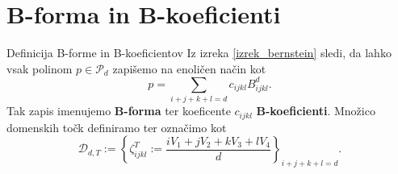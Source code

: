 \documentclass{beamer}
\begin{document}
\section{B-forma in B-koeficienti}
\begin{frame}{Definicija B-forme in B-koeficientov}
Iz izreka \ref{izrek_bernstein} sledi, da lahko vsak polinom $p \in \mathcal{P}_d$ zapišemo na enoličen način kot
\begin{equation}\label{eq_Bforma}
    p = \sum_{i+j+k+l = d} c_{ijkl} B_{ijkl}^d.
\end{equation}
Tak zapis imenujemo \textbf{B-forma} ter koeficente $c_{ijkl}$ \textbf{B-koeficienti}.
Množico domenskih točk definiramo ter označimo kot
\begin{equation}
    \mathcal{D}_{d,T} := 
    \left\{
        \zeta_{ijkl}^T:= \frac{i V_1 + j V_2 + k V_3 + l V_4}{d}
     \right\}_{i + j+ k+l = d}.
\end{equation}
\end{frame}
\end{document}
